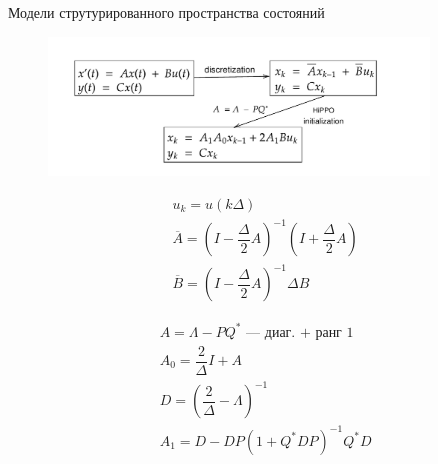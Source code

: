 \documentclass[10pt,pdf,hyperref={unicode}]{beamer}
\begin{document}
\begin{frame}{Модели струтурированного пространства состояний}
	\begin{figure}
		\includegraphics[width=0.9\textwidth]{s4-diagram.pdf}
	\end{figure}

	\begin{multicols}{2}
		\begin{align*}
			&u_k = u(k\Delta) \\
			&\overline{A} = (I - \dfrac{\Delta}{2} A)^{-1} (I + \dfrac{\Delta}{2} A) \\
			&\overline{B} = (I - \dfrac{\Delta}{2} A)^{-1} \Delta B
		\end{align*}
	
		\begin{align*}
			&A = \Lambda - PQ^* \text{~--- диаг. + ранг 1}\\
			&A_0 = \dfrac{2}{\Delta} I + A \\
			&D = (\dfrac{2}{\Delta} - \Lambda)^{-1} \\
			&A_1 = D - DP(1 + Q^*DP)^{-1}Q^*D
		\end{align*}
	\end{multicols}
\end{frame}
\end{document}
